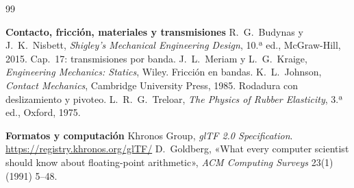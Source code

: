 \documentclass[11pt,a4paper]{article}
\numberwithin{equation}{section}
\begin{document}
\begin{thebibliography}{99}
\item[] \textbf{Contacto, fricción, materiales y transmisiones}
 R.~G.~Budynas y J.~K.~Nisbett, \emph{Shigley's Mechanical Engineering Design}, 10.ª ed.,
  McGraw-Hill, 2015. Cap.~17: transmisiones por banda.
 J.~L.~Meriam y L.~G.~Kraige, \emph{Engineering Mechanics: Statics}, Wiley. Fricción en bandas.
 K.~L.~Johnson, \emph{Contact Mechanics}, Cambridge University Press, 1985. Rodadura con
  deslizamiento y pivoteo.
 L.~R.~G.~Treloar, \emph{The Physics of Rubber Elasticity}, 3.ª ed., Oxford, 1975.

\item[] \textbf{Formatos y computación}
 Khronos Group, \emph{glTF 2.0 Specification}. \url{https://registry.khronos.org/glTF/}
 D.~Goldberg, «What every computer scientist should know about floating-point arithmetic», \emph{ACM
  Computing Surveys} 23(1) (1991) 5--48.
\end{thebibliography}
\end{document}

